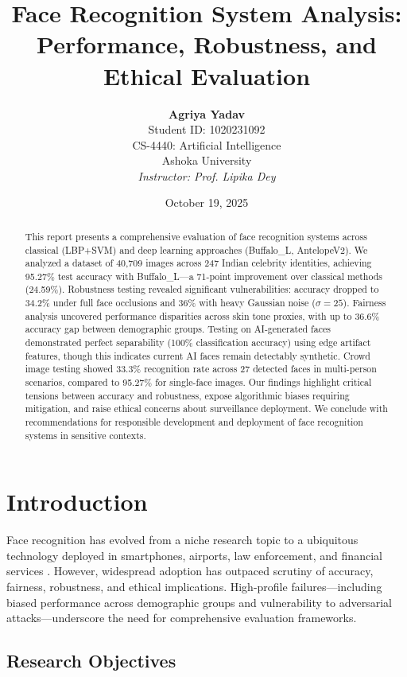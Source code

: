 \documentclass[11pt,a4paper]{article}
\title{
    \vspace{-1cm}
    \textbf{\color{primary}\LARGE Face Recognition System Analysis:}\\
    \vspace{0.3cm}
    \textbf{\color{primary}\Large Performance, Robustness, and Ethical Evaluation}
}
\author{
    \textbf{Agriya Yadav}\\
    Student ID: 1020231092\\
    \vspace{0.2cm}
    CS-4440: Artificial Intelligence\\
    Ashoka University\\
    \vspace{0.2cm}
    \textit{Instructor: Prof. Lipika Dey}
}
\date{October 19, 2025}
\begin{document}
\maketitle
\thispagestyle{empty}

\begin{abstract}
\noindent
This report presents a comprehensive evaluation of face recognition systems across classical (LBP+SVM) and deep learning approaches (Buffalo\_L, AntelopeV2). We analyzed a dataset of 40,709 images across 247 Indian celebrity identities, achieving 95.27\% test accuracy with Buffalo\_L—a 71-point improvement over classical methods (24.59\%). Robustness testing revealed significant vulnerabilities: accuracy dropped to 34.2\% under full face occlusions and 36\% with heavy Gaussian noise ($\sigma=25$). Fairness analysis uncovered performance disparities across skin tone proxies, with up to 36.6\% accuracy gap between demographic groups. Testing on AI-generated faces demonstrated perfect separability (100\% classification accuracy) using edge artifact features, though this indicates current AI faces remain detectably synthetic. Crowd image testing showed 33.3\% recognition rate across 27 detected faces in multi-person scenarios, compared to 95.27\% for single-face images. Our findings highlight critical tensions between accuracy and robustness, expose algorithmic biases requiring mitigation, and raise ethical concerns about surveillance deployment. We conclude with recommendations for responsible development and deployment of face recognition systems in sensitive contexts.
\end{abstract}

\newpage
\tableofcontents
\newpage

\section{Introduction}

Face recognition has evolved from a niche research topic to a ubiquitous technology deployed in smartphones, airports, law enforcement, and financial services \cite{deng2019arcface}. However, widespread adoption has outpaced scrutiny of accuracy, fairness, robustness, and ethical implications. High-profile failures—including biased performance across demographic groups \cite{buolamwini2018gender} and vulnerability to adversarial attacks—underscore the need for comprehensive evaluation frameworks.

\subsection{Research Objectives}
\end{document}
